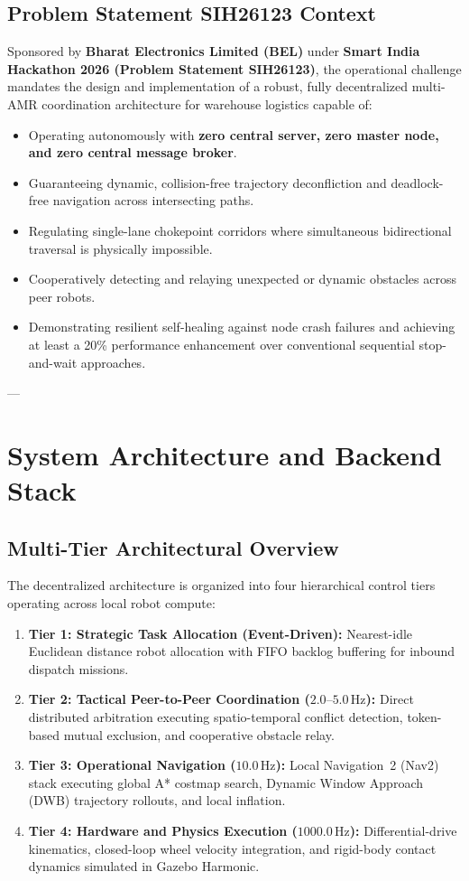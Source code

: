 \documentclass[10pt,twocolumn,a4paper]{article}
\theoremstyle{definition}
\begin{document}
\subsection{Problem Statement SIH26123 Context}
Sponsored by \textbf{Bharat Electronics Limited (BEL)} under \textbf{Smart India Hackathon 2026 (Problem Statement SIH26123)}, the operational challenge mandates the design and implementation of a robust, fully decentralized multi-AMR coordination architecture for warehouse logistics capable of:
\begin{itemize}
    \item Operating autonomously with \textbf{zero central server, zero master node, and zero central message broker}.
    \item Guaranteeing dynamic, collision-free trajectory deconfliction and deadlock-free navigation across intersecting paths.
    \item Regulating single-lane chokepoint corridors where simultaneous bidirectional traversal is physically impossible.
    \item Cooperatively detecting and relaying unexpected or dynamic obstacles across peer robots.
    \item Demonstrating resilient self-healing against node crash failures and achieving at least a 20\% performance enhancement over conventional sequential stop-and-wait approaches.
\end{itemize}

---

\section{System Architecture and Backend Stack}

\subsection{Multi-Tier Architectural Overview}
The decentralized architecture is organized into four hierarchical control tiers operating across local robot compute:
\begin{enumerate}
    \item \textbf{Tier 1: Strategic Task Allocation (Event-Driven):} Nearest-idle Euclidean distance robot allocation with FIFO backlog buffering for inbound dispatch missions.
    \item \textbf{Tier 2: Tactical Peer-to-Peer Coordination ($2.0\text{--}5.0\,\text{Hz}$):} Direct distributed arbitration executing spatio-temporal conflict detection, token-based mutual exclusion, and cooperative obstacle relay.
    \item \textbf{Tier 3: Operational Navigation ($10.0\,\text{Hz}$):} Local Navigation~2 (Nav2) stack executing global A* costmap search, Dynamic Window Approach (DWB) trajectory rollouts, and local inflation.
    \item \textbf{Tier 4: Hardware and Physics Execution ($1000.0\,\text{Hz}$):} Differential-drive kinematics, closed-loop wheel velocity integration, and rigid-body contact dynamics simulated in Gazebo Harmonic.
\end{enumerate}
\end{document}
